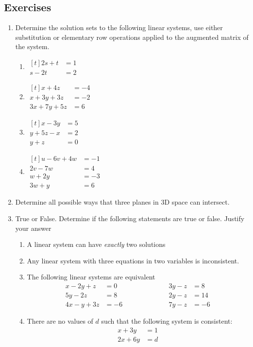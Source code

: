\documentclass[12pt]{article}
\numberwithin{equation}{subsection}
\numberwithin{figure}{subsection}
\theoremstyle{note}
\begin{document}
\subsection{Exercises}
\begin{enumerate}[label=\arabic*.]
\item Determine the solution sets to the following linear systems, use either substitution or elementary row operations applied to the augmented matrix of the system.
\begin{enumerate}
	\item \; $\begin{aligned}[t] 2s+t&=1 \\ s-2t &=2 \end{aligned}$
	
	\item \;
	$\begin{aligned}[t] 
	 x+4z&=-4 \\ x+3y+3z&=-2 \\ 3x+7y+5z&=6
	\end{aligned}$
	\item \; $\begin{aligned}[t]
		x-3y&=5\\ y+5z-x&=2\\y+z&=0
	\end{aligned}$
	\item\; $\begin{aligned}[t] u-6v+4w&=-1 \\ 2v-7w&=4 \\ w+2y&=-3 \\ 3w+y&=6\end{aligned}$
\end{enumerate}

\item Determine all possible ways that three planes in 3D space can intersect.

\item True or False. Determine if the following statements are true or false. Justify your answer
\begin{enumerate}
	\item A linear system can have \textit{exactly} two solutions
	\item Any linear system with three equations in two variables is inconsistent.
	\item The following linear systems are equivalent \[ \begin{aligned} x-2y+z&=0  \\ 5y-2z &= 8 \\ 4x-y+3z&=-6 \end{aligned} 
	\qquad\qquad \qquad  \begin{aligned} 3y-z&=8 \\ 
	 2y-z&=14 \\
	 7y-z&=-6\end{aligned} \]
	\item There are no values of $d$ such that the following system is consistent: \begin{align*} x+3y &=1 \\2x+6y&=d\end{align*}
	\end{enumerate}
\end{enumerate}
\end{document}
